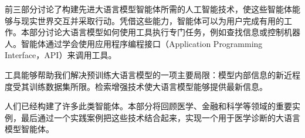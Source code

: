 前三部分讨论了构建先进大语言模型智能体所需的人工智能技术，使这些智能体能够与现实世界交互并采取行动。凭借这些能力，智能体可以为用户完成有用的工作。本部分讨论大语言模型如何使用工具执行专门任务，例如查找信息或控制机器人。智能体通过学会使用应用程序编程接口（Application Programming Interface，API）来调用工具。

工具能够帮助我们解决预训练大语言模型的一项主要局限：模型内部信息的新近程度受其训练数据集所限。检索增强技术使大语言模型能够提供最新信息。

人们已经构建了许多此类智能体。本部分将回顾医学、金融和科学等领域的重要实例，最后通过一个实践案例把这些技术结合起来，实现一个用于医学诊断的大语言模型智能体。
